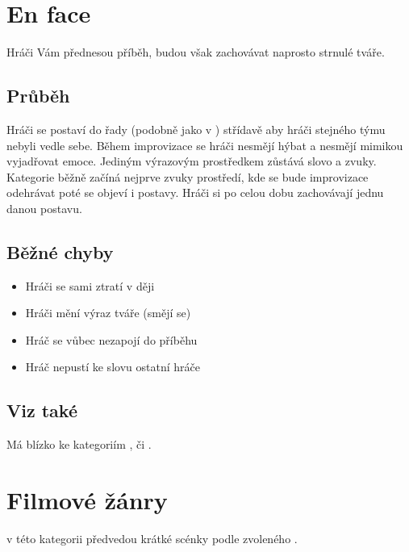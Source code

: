 \documentclass[main.tex]{subfiles}
\begin{document}
 
 
 
\needspace{5cm} \section{En face} \label{en face}  
 
Hráči Vám přednesou příběh, budou však zachovávat naprosto strnulé tváře. 
 
\subsection{ Průběh } Hráči se postaví do řady (podobně jako v ) střídavě aby hráči stejného týmu nebyli vedle sebe. Během improvizace se hráči nesmějí hýbat a nesmějí mimikou vyjadřovat emoce. Jediným výrazovým prostředkem zůstává slovo a zvuky. Kategorie běžně začíná nejprve zvuky prostředí, kde se bude improvizace odehrávat poté se objeví i postavy. Hráči si po celou dobu zachovávají jednu danou postavu. 
 
\subsection{ Běžné chyby } \begin{itemize}
\item  Hráči se sami ztratí v ději
\item  Hráči mění výraz tváře (smějí se)
\item  Hráč se vůbec nezapojí do příběhu
\item  Hráč nepustí ke slovu ostatní hráče
\end{itemize}
 
\subsection{ Viz také } Má blízko ke kategoriím ,  či . 
 
 
 
 
\needspace{5cm} \section{Filmové žánry} \label{filmové žánry}  
 
 
 v této kategorii předvedou krátké scénky podle zvoleného . 
 
\end{document}
